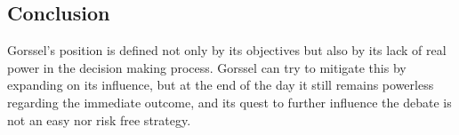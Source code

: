 \subsection{Conclusion}

Gorssel's position is defined not only by its objectives but also by its lack of real power in the decision making process. Gorssel can try to mitigate this by expanding on its influence, but at the end of the day it still remains powerless regarding the immediate outcome, and its quest to further influence the debate is not an easy nor risk free strategy.



